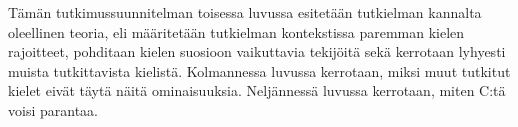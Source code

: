 
Tämän tutkimussuunnitelman toisessa luvussa esitetään tutkielman kannalta
oleellinen teoria, eli määritetään tutkielman kontekstissa paremman kielen
rajoitteet, pohditaan kielen suosioon vaikuttavia tekijöitä sekä kerrotaan
lyhyesti muista tutkittavista kielistä. Kolmannessa luvussa kerrotaan, miksi
muut tutkitut kielet eivät täytä näitä ominaisuuksia. Neljännessä luvussa
kerrotaan, miten C:tä voisi parantaa.
